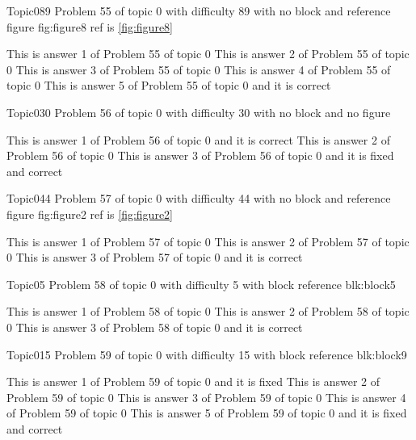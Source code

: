 \documentclass[master]{exam}
\begin{document}
\begin{problem}{Topic0}{89}
	Problem 55 of topic 0 with difficulty 89 with no block and reference figure fig:figure8 ref is \ref{fig:figure8}
	\begin{answers}
		\answer This is answer 1 of Problem 55 of topic 0 
		\answer This is answer 2 of Problem 55 of topic 0 
		\answer This is answer 3 of Problem 55 of topic 0 
		\answer This is answer 4 of Problem 55 of topic 0 
		\answer[correct] This is answer 5 of Problem 55 of topic 0 and it is correct
	\end{answers}
\end{problem}

\begin{problem}{Topic0}{30}
	Problem 56 of topic 0 with difficulty 30 with no block and no figure
	\begin{answers}
		\answer[correct] This is answer 1 of Problem 56 of topic 0 and it is correct
		\answer This is answer 2 of Problem 56 of topic 0 
		 This is answer 3 of Problem 56 of topic 0 and it is fixed and correct
	\end{answers}
\end{problem}

\begin{problem}{Topic0}{44}
	Problem 57 of topic 0 with difficulty 44 with no block and reference figure fig:figure2 ref is \ref{fig:figure2}
	\begin{answers}
		\answer This is answer 1 of Problem 57 of topic 0 
		\answer This is answer 2 of Problem 57 of topic 0 
		\answer[correct] This is answer 3 of Problem 57 of topic 0 and it is correct
	\end{answers}
\end{problem}

\begin{problem}[requires=blk:block5]{Topic0}{5}
	Problem 58 of topic 0 with difficulty 5 with block reference blk:block5
	\begin{answers}
		\answer This is answer 1 of Problem 58 of topic 0 
		\answer This is answer 2 of Problem 58 of topic 0 
		\answer[correct] This is answer 3 of Problem 58 of topic 0 and it is correct
	\end{answers}
\end{problem}

\begin{problem}[requires=blk:block9]{Topic0}{15}
	Problem 59 of topic 0 with difficulty 15 with block reference blk:block9
	\begin{answers}
		\answer[fixed] This is answer 1 of Problem 59 of topic 0 and it is fixed
		\answer This is answer 2 of Problem 59 of topic 0 
		\answer This is answer 3 of Problem 59 of topic 0 
		\answer This is answer 4 of Problem 59 of topic 0 
		 This is answer 5 of Problem 59 of topic 0 and it is fixed and correct
	\end{answers}
\end{problem}
\end{document}
